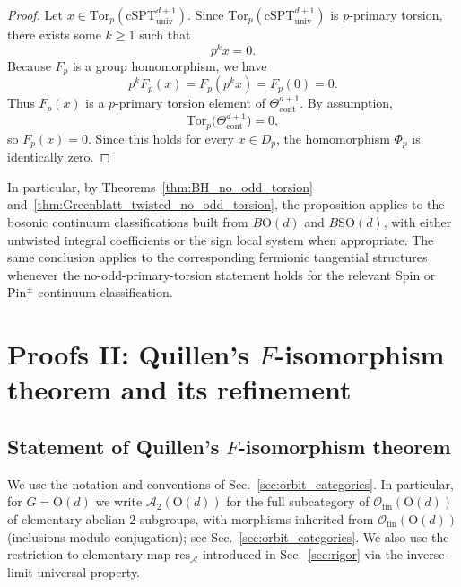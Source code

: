 \documentclass[aps,prx,reprint,superscriptaddress,twocolumn,amsmath,amssymb,amsfonts, nofootinbib]{revtex4-2}
\newcommand{\SO}{\text{SO}}
\newcommand{\ofin}{\mathcal{O}_{\text{fin}}}
\newcommand{\qa}{\mathcal{A}_{2}}
\newcommand{\res}{\text{res}}
\newcommand{\tor}{\text{Tor}}
\theoremstyle{apsstyle}
\begin{document}
\begin{proof}
Let $x\in \tor_{p}(\mathrm{cSPT}^{d+1}_{\mathrm{univ}})$. Since $\tor_{p}(\mathrm{cSPT}^{d+1}_{\mathrm{univ}})$ is $p$-primary torsion, there exists some $k\geq 1$ such that
\begin{equation}
p^k x=0.
\end{equation}
Because $F_p$ is a group homomorphism, we have
\begin{equation}
p^kF_p(x)
= F_p(p^k x) = F_p(0) = 0.
\end{equation}
Thus $F_p(x)$ is a $p$-primary torsion element of $\Theta^{d+1}_{\mathrm{cont}}$. By assumption,
\begin{equation}
\tor_p\bigl(\Theta^{d+1}_{\mathrm{cont}}\bigr)=0,
\end{equation}
so $F_p(x)=0$. Since this holds for every $x\in D_p$, the homomorphism $\Phi_p$ is identically zero.
\end{proof}

In particular, by Theorems~\ref{thm:BH_no_odd_torsion} and~\ref{thm:Greenblatt_twisted_no_odd_torsion}, the proposition applies to the bosonic continuum classifications built from $B\mathrm{O}(d)$ and $B\SO(d)$, with either untwisted integral coefficients or the sign local system when appropriate. The same conclusion applies to the corresponding fermionic tangential structures whenever the no-odd-primary-torsion statement holds for the relevant $\mathrm{Spin}$ or $\mathrm{Pin}^{\pm}$ continuum classification.


\section{Proofs II: Quillen's $F$-isomorphism theorem and its refinement}
\label{app:proofs2}

\subsection{Statement of Quillen's $F$-isomorphism theorem}
\label{app:quillen_statement}

We use the notation and conventions of Sec.~\ref{sec:orbit_categories}.
In particular, for $G=\mathrm{O}(d)$ we write $\qa(\mathrm{O}(d))$ for the full subcategory of $\ofin(\mathrm{O}(d))$ of elementary abelian $2$-subgroups, with morphisms inherited from $\ofin(\mathrm{O}(d))$ (inclusions modulo conjugation); see Sec.~\ref{sec:orbit_categories}. We also use the restriction-to-elementary map $\res_{\mathcal A}$ introduced in Sec.~\ref{sec:rigor} via the inverse-limit universal property.
\end{document}

